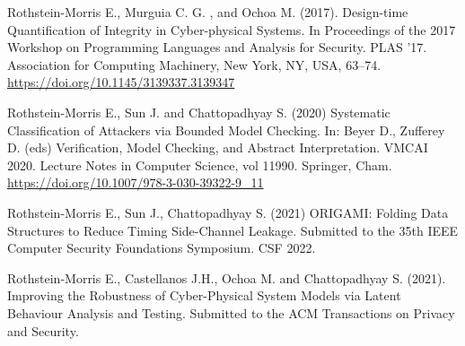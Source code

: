 \documentclass[
11pt, %
oneside, %
english, %
singlespacing, %
parskip, %
headsepline, %
]{MastersDoctoralThesis} %
\theoremstyle{definition}
\newcommand{\0}{{0_\TheCategoryOfSets}}
\newcommand{\1}{{1_\TheCategoryOfSets}}
\begin{document}

\begin{publications}
\addchaptertocentry{\publicationsname} %

Rothstein-Morris E., Murguia C. G. , and Ochoa M. (2017). Design-time Quantification of Integrity in Cyber-physical Systems. In Proceedings of the 2017 Workshop on Programming Languages and Analysis for Security. PLAS '17. Association for Computing Machinery, New York, NY, USA, 63–74. \url{https://doi.org/10.1145/3139337.3139347}

Rothstein-Morris E., Sun J. and Chattopadhyay S. (2020) Systematic Classification of Attackers via Bounded Model Checking. In: Beyer D., Zufferey D. (eds) Verification, Model Checking, and Abstract Interpretation. VMCAI 2020. Lecture Notes in Computer Science, vol 11990. Springer, Cham. \url{https://doi.org/10.1007/978-3-030-39322-9_11}

Rothstein-Morris E., Sun J., Chattopadhyay S. (2021) ORIGAMI: Folding Data Structures to Reduce Timing Side-Channel Leakage. Submitted to the 35th IEEE Computer Security Foundations Symposium. CSF 2022. 

Rothstein-Morris E., Castellanos J.H., Ochoa M. and Chattopadhyay S. (2021). Improving the Robustness of Cyber-Physical System Models via Latent Behaviour Analysis and Testing. Submitted to the ACM Transactions on Privacy and Security. 
\end{publications}

\end{document}

